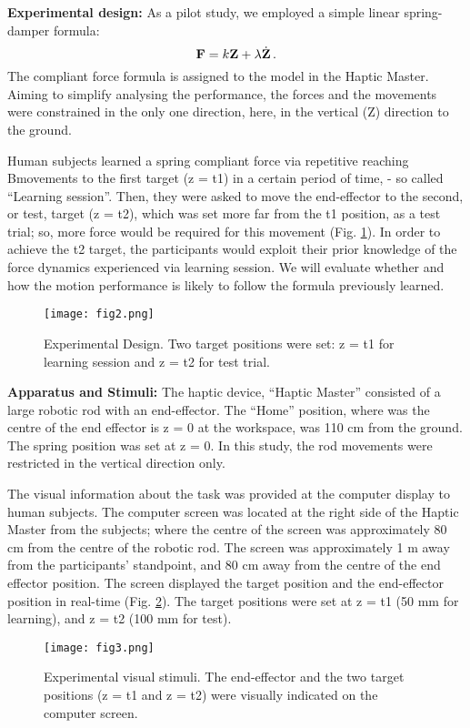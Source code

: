 
\textbf{Experimental design:} As a pilot study, we employed a simple linear spring-damper formula:
%
\begin{equation}
\mathbf{F} = k \mathbf{Z} + \lambda \dot{\mathbf{Z}} \, .
\end{equation}
%
The compliant force formula is assigned to the model in the Haptic
Master. Aiming to simplify analysing the performance, the forces and the
movements were constrained in the only one direction, here, in the vertical
(Z) direction to the ground.

Human subjects learned a spring compliant force via repetitive reaching
Bmovements to the first target (z = t1) in a certain period of time, - so
called ``Learning session''.  Then, they were asked to move the end-effector
to the second, or test, target (z = t2), which was set more far from the t1
position, as a test trial; so, more force would be required for this movement
(Fig. \ref*{design}). In order to achieve the t2 target, the participants would exploit
their prior knowledge of the force dynamics experienced via learning
session. We will evaluate whether and how the motion performance is likely to
follow the formula previously learned.
%
\begin{figure}
	\centering
	\texttt{[image: fig2.png]}
	\caption{Experimental Design. Two target positions were set: z = t1
		for learning session and z = t2 for test trial.}
	\label{design}
\end{figure}



\textbf{Apparatus and Stimuli:} The haptic device, ``Haptic Master'' consisted of a large robotic rod with an
end-effector. The ``Home'' position, where was the centre of the end effector
is z = 0 at the workspace, was 110 cm from the ground. The spring position was
set at z = 0. In this study, the rod movements were restricted in the vertical
direction only.

The visual information about the task was provided at the computer display to
human subjects. The computer screen was located at the right side of the
Haptic Master from the subjects; where the centre of the screen was
approximately 80 cm from the centre of the robotic rod. The screen was
approximately 1 m away from the participants' standpoint, and 80 cm away from
the centre of the end effector position. The screen displayed the target
position and the end-effector position in real-time (Fig. \ref{stimuli}). The target
positions were set at z = t1 (50 mm for learning), and z = t2 (100 mm for
test).
%
\begin{figure}
	\centering
	\texttt{[image: fig3.png]}
	\caption{Experimental visual stimuli. The end-effector and the two target 
		positions (z = t1 and z = t2) were visually indicated on the computer 
		screen.}
	\label{stimuli}
\end{figure}

